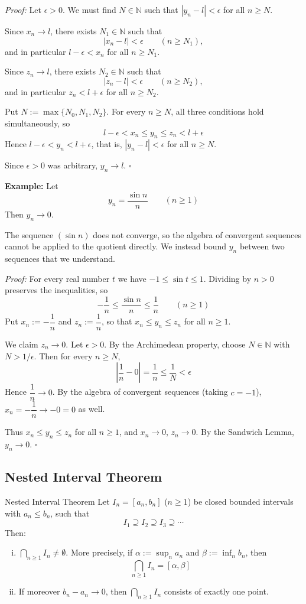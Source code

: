 \documentclass[a4paper,11pt,abstracton]{scrartcl}
\newcommand{\NN}{\mathbb{N}}
\theoremstyle{dotlessP}
\theoremstyle{dotlessS}
\theoremstyle{remark}
\theoremstyle{definition}
\begin{document}
\begin{claim_box}
\textit{Proof:}
Let $\epsilon>0$. We must find $N\in\NN$ such that $|y_n-l|<\epsilon$ for all $n\ge N$.

Since $x_n\to l$, there exists $N_1\in\NN$ such that
\[
    |x_n-l|<\epsilon\qquad(n\ge N_1),
\]
and in particular $l-\epsilon<x_n$ for all $n\ge N_1$.

Since $z_n\to l$, there exists $N_2\in\NN$ such that
\[
    |z_n-l|<\epsilon\qquad(n\ge N_2),
\]
and in particular $z_n<l+\epsilon$ for all $n\ge N_2$.

Put $N:=\max\{N_0,N_1,N_2\}$. For every $n\ge N$, all three conditions hold simultaneously, so
\[
    l-\epsilon<x_n\le y_n\le z_n<l+\epsilon
\]
Hence $l-\epsilon<y_n<l+\epsilon$, that is, $|y_n-l|<\epsilon$ for all $n\ge N$.

Since $\epsilon>0$ was arbitrary, $y_n\to l$.
\hfill$\square$
\end{claim_box}

\begin{example_box}
\textbf{Example:} Let
\[
    y_n=\frac{\sin n}{n}\qquad(n\ge1)
\]
Then $y_n\to0$.

The sequence $(\sin n)$ does not converge, so the algebra of convergent
sequences cannot be applied to the quotient directly. We instead bound
$y_n$ between two sequences that we understand.

\textit{Proof:}
For every real number $t$ we have $-1\le\sin t\le1$. Dividing by $n>0$
preserves the inequalities, so
\[
    -\frac1n\le\frac{\sin n}{n}\le\frac1n\qquad(n\ge1)
\]
Put $x_n:=-\dfrac1n$ and $z_n:=\dfrac1n$, so that $x_n\le y_n\le z_n$
for all $n\ge1$.

We claim $z_n\to0$. Let $\epsilon>0$. By the Archimedean property,
choose $N\in\NN$ with $N>1/\epsilon$. Then for every $n\ge N$,
\[
    \left|\frac1n-0\right|=\frac1n\le\frac1N<\epsilon
\]
Hence $\dfrac1n\to0$. By the algebra of convergent sequences (taking
$c=-1$), $x_n=-\dfrac1n\to-0=0$ as well.

Thus $x_n\le y_n\le z_n$ for all $n\ge1$, and $x_n\to0$, $z_n\to0$.
By the Sandwich Lemma, $y_n\to0$.
\hfill$\square$
\end{example_box}


\subsection{Nested Interval Theorem}

\begin{mainbox}{Nested Interval Theorem}
Let $I_n=[a_n,b_n]$ ($n\ge1$) be closed bounded intervals with $a_n\le b_n$, such that
\[
    I_1\supseteq I_2\supseteq I_3\supseteq\cdots
\]
Then:
\begin{enumerate}[(i)]
    \item $\displaystyle\bigcap_{n\ge1}I_n\ne\emptyset$. More precisely, if
    $\alpha:=\sup_n a_n$ and $\beta:=\inf_n b_n$, then
    \[
        \bigcap_{n\ge1}I_n=[\alpha,\beta]
    \]
    \item If moreover $b_n-a_n\to0$, then $\bigcap_{n\ge1}I_n$ consists of exactly one point.
\end{enumerate}
\end{mainbox}
\end{document}
